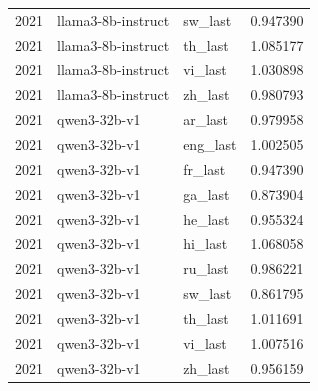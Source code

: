 \begin{tabular}{lllr}
2021 & llama3-8b-instruct & sw\_last & 0.947390 \\
2021 & llama3-8b-instruct & th\_last & 1.085177 \\
2021 & llama3-8b-instruct & vi\_last & 1.030898 \\
2021 & llama3-8b-instruct & zh\_last & 0.980793 \\
2021 & qwen3-32b-v1 & ar\_last & 0.979958 \\
2021 & qwen3-32b-v1 & eng\_last & 1.002505 \\
2021 & qwen3-32b-v1 & fr\_last & 0.947390 \\
2021 & qwen3-32b-v1 & ga\_last & 0.873904 \\
2021 & qwen3-32b-v1 & he\_last & 0.955324 \\
2021 & qwen3-32b-v1 & hi\_last & 1.068058 \\
2021 & qwen3-32b-v1 & ru\_last & 0.986221 \\
2021 & qwen3-32b-v1 & sw\_last & 0.861795 \\
2021 & qwen3-32b-v1 & th\_last & 1.011691 \\
2021 & qwen3-32b-v1 & vi\_last & 1.007516 \\
2021 & qwen3-32b-v1 & zh\_last & 0.956159 \\
\bottomrule
\end{tabular}